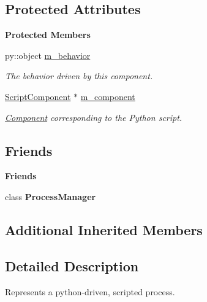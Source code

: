 \subsection*{Protected Attributes}
\begin{Indent}\textbf{ Protected Members}\par
\begin{DoxyCompactItemize}
\item 
py\+::object \mbox{\hyperlink{classrev_1_1_scripted_process_a0ac5ba59dc533ad82292f46208c61fb5}{m\+\_\+behavior}}
\begin{DoxyCompactList}\small\item\em The behavior driven by this component. \end{DoxyCompactList}\item 
\mbox{\label{classrev_1_1_scripted_process_a5851c2fe7cc7267448576730f02001e5}} 
\mbox{\hyperlink{classrev_1_1_script_component}{Script\+Component}} $\ast$ \mbox{\hyperlink{classrev_1_1_scripted_process_a5851c2fe7cc7267448576730f02001e5}{m\+\_\+component}}
\begin{DoxyCompactList}\small\item\em \mbox{\hyperlink{classrev_1_1_component}{Component}} corresponding to the Python script. \end{DoxyCompactList}\end{DoxyCompactItemize}
\end{Indent}
\subsection*{Friends}
\begin{Indent}\textbf{ Friends}\par
\begin{DoxyCompactItemize}
\item 
\mbox{\label{classrev_1_1_scripted_process_ae1701c7594fe2cf1c96b951a52eb0396}} 
class {\bfseries Process\+Manager}
\end{DoxyCompactItemize}
\end{Indent}
\subsection*{Additional Inherited Members}


\subsection{Detailed Description}
Represents a python-\/driven, scripted process. 

